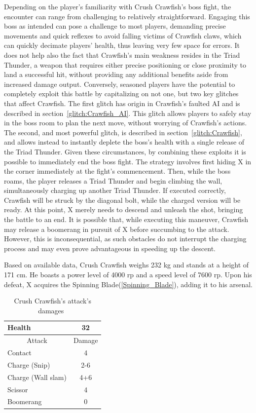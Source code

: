Depending on the player's familiarity with Crush Crawfish's boss fight, the encounter can range from challenging to relatively straightforward. Engaging this boss as intended can pose a challenge to most players, demanding precise movements and quick reflexes to avoid falling victims of Crawfish claws, which can quickly decimate players' health, thus leaving very few space for errors. It does not help also the fact that Crawfish's main weakness resides in the Triad Thunder, a weapon that requires either precise positioning or close proximity to land a successful hit, without providing any additional benefits aside from increased damage output. Conversely, seasoned players have the potential to completely exploit this battle by capitalizing on not one, but two key glitches that affect Crawfish. The first glitch has origin in Crawfish's faulted AI  and is described in section~\ref{glitch:Crawfish_AI}. This glitch allows players to safely stay in the boss room to plan the next move, without worrying of Crawfish's actions. The second, and most powerful glitch, is described in section~\ref{glitch:Crawfish}, and allows instead to instantly deplete the boss's health with a single release of the Triad Thunder. Given these circumstances, by combining these exploits it is possible to immediately end the boss fight. The strategy involves first hiding X in the corner immediately at the fight's commencement. Then, while the boss roams, the player releases a Triad Thunder and begin climbing the wall, simultaneously charging up another Triad Thunder. If executed correctly, Crawfish will be struck by the diagonal bolt, while the charged version will be ready. At this point, X merely needs to descend and unleash the shot, bringing the battle to an end. It is possible that, while executing this maneuver, Crawfish may release a boomerang in pursuit of X before succumbing to the attack. However, this is inconsequential, as such obstacles do not interrupt the charging process and may even prove advantageous in speeding up the descent.


Based on available data, Crush Crawfish weighs 232 kg and stands at a height of 171 cm. He boasts a power level of 4000 rp and a speed level of 7600 rp. Upon his defeat, X acquires the Spinning Blade(\ref{Spinning_Blade}), adding it to his arsenal.

\begin{table}[htp]
	\centering
	\begin{tabular}[h]{l c}
		\toprule
		Health  & 32\\
		\midrule
		\multicolumn{1}{c}{Attack} & \multicolumn{1}{c}{Damage}\\
		Contact & 4\\
		Charge (Snip)& 2-6\\
		Charge (Wall slam)& 4+6\\
		Scissor& 4\\
		Boomerang & 0\\
		\bottomrule
	\end{tabular}
	\caption{Crush Crawfish's attack's damages~\cite{wiki:Crush_crawfish,book:Compendium}}
\end{table} 

